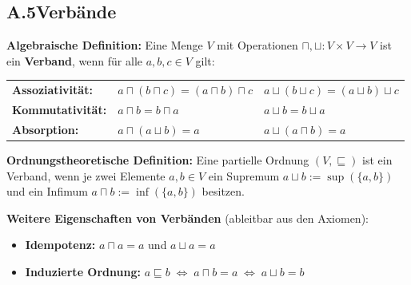 \subsection*{A.5\quad Verbände}

\noindent\textbf{Algebraische Definition:} Eine Menge $V$ mit Operationen $\sqcap, \sqcup : V \times V \to V$ ist ein \textbf{Verband}, wenn für alle $a,b,c \in V$ gilt:

\begin{center}
\renewcommand{\arraystretch}{1.4}
\begin{tabular}{l l l}
\textbf{Assoziativität:} & $a \sqcap (b \sqcap c) = (a \sqcap b) \sqcap c$ & $a \sqcup (b \sqcup c) = (a \sqcup b) \sqcup c$ \\
\textbf{Kommutativität:} & $a \sqcap b = b \sqcap a$ & $a \sqcup b = b \sqcup a$ \\
\textbf{Absorption:}     & $a \sqcap (a \sqcup b) = a$ & $a \sqcup (a \sqcap b) = a$ \\
\end{tabular}
\end{center}

\noindent\textbf{Ordnungstheoretische Definition:} Eine partielle Ordnung $(V,\sqsubseteq)$ ist ein Verband, wenn je zwei Elemente $a,b \in V$ ein Supremum $a \sqcup b := \sup(\{a,b\})$ und ein Infimum $a \sqcap b := \inf(\{a,b\})$ besitzen.

\medskip
\noindent\textbf{Weitere Eigenschaften von Verbänden} (ableitbar aus den Axiomen):
\begin{itemize}
  \item \textbf{Idempotenz:} $a \sqcap a = a$ und $a \sqcup a = a$
  \item \textbf{Induzierte Ordnung:} $a \sqsubseteq b \;\Leftrightarrow\; a \sqcap b = a \;\Leftrightarrow\; a \sqcup b = b$
\end{itemize}



